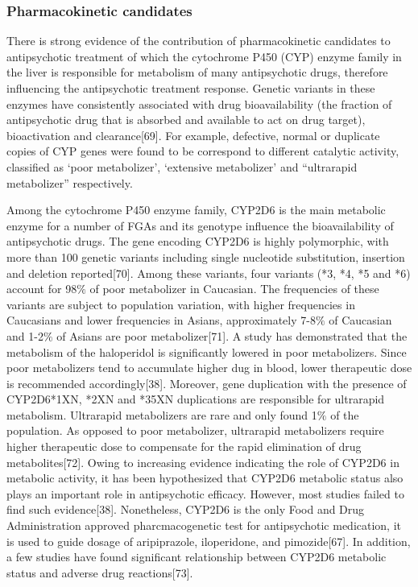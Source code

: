 \documentclass[12pt]{report}
\begin{document}
			\subsubsection{Pharmacokinetic candidates}
				There is strong evidence of the contribution of pharmacokinetic candidates to antipsychotic treatment of which the cytochrome P450 (CYP) enzyme family in the liver is responsible for metabolism of many antipsychotic drugs, therefore influencing the antipsychotic treatment response. 
				Genetic variants in these enzymes have consistently associated with drug bioavailability (the fraction of antipsychotic drug that is absorbed and available to act on drug target), bioactivation and clearance[69]. 
				For example, defective, normal or duplicate copies of CYP genes were found to be correspond to different catalytic activity, classified as ‘poor metabolizer’, ‘extensive metabolizer’ and “ultrarapid metabolizer” respectively.
				 
				Among the cytochrome P450 enzyme family, CYP2D6 is the main metabolic enzyme for a number of FGAs and its genotype influence the bioavailability of antipsychotic drugs. 
				The gene encoding CYP2D6 is highly polymorphic, with more than 100 genetic variants including single nucleotide substitution, insertion and deletion reported[70]. 
				Among these variants, four variants (*3, *4, *5 and *6) account for 98$\%$ of poor metabolizer in Caucasian. 
				The frequencies of these variants are subject to population variation, with higher frequencies in Caucasians and lower frequencies in Asians, approximately 7-8$\%$ of Caucasian and 1-2$\%$ of Asians are poor metabolizer[71]. 
				A study has demonstrated that the metabolism of the haloperidol is significantly lowered in poor metabolizers. 
				Since poor metabolizers tend to accumulate higher dug in blood, lower therapeutic dose is recommended accordingly[38]. 
				Moreover, gene duplication with the presence of CYP2D6*1XN, *2XN and *35XN duplications are responsible for ultrarapid metabolism. 
				Ultrarapid metabolizers are rare and only found 1$\%$ of the population. 
				As opposed to poor metabolizer, ultrarapid metabolizers require higher therapeutic dose to compensate for the rapid elimination of drug metabolites[72]. 
				Owing to increasing evidence indicating the role of CYP2D6 in metabolic activity, it has been hypothesized that CYP2D6 metabolic status also plays an important role in antipsychotic efficacy.
				However, most studies failed to find such evidence[38]. 
				Nonetheless, CYP2D6 is the only Food and Drug Administration approved pharcmacogenetic test for antipsychotic medication, it is used to guide dosage of aripiprazole, iloperidone, and pimozide[67]. 
				In addition, a few studies have found significant relationship between CYP2D6 metabolic status and adverse drug reactions[73].
				 
\end{document}
